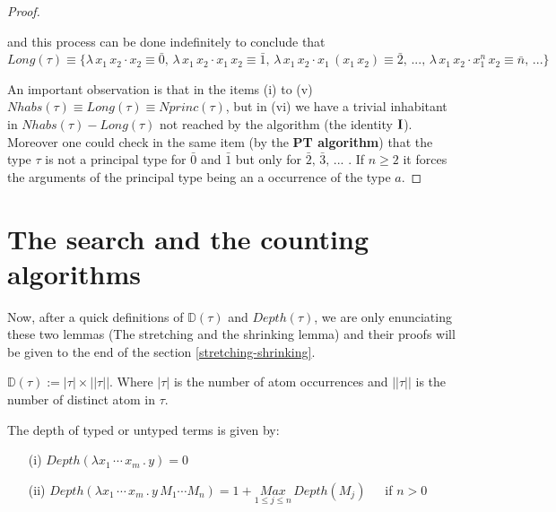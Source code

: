 \documentclass[a4paper,10pt]{article}
\begin{document}
\begin{exa}
\begin{proof}
\begin{itemize}
               and this process can be done indefinitely to conclude that \\
               $Long(\tau) \equiv \{\lambda\,x_1\,x_2\cdot x_2\equiv \bar{0},\, \lambda\,x_1\,x_2\cdot x_1\,x_2\equiv \bar{1},\,\lambda\,x_1\,x_2\cdot x_1\,(x_1\,x_2) \equiv \bar{2},\, ...,\, \lambda\,x_1\,x_2\cdot x_1^n\,x_2\equiv \bar{n},\, ...\}$
 \end{itemize}
 An important observation is that in the items (i) to (v) $Nhabs(\tau) \equiv Long(\tau) \equiv Nprinc(\tau)$, but in (vi) we have a trivial inhabitant in $Nhabs(\tau) - Long(\tau)$
 not reached by the algorithm (the identity $\mbox{\textbf{I}}$). Moreover one could check in the same item (by the \textbf{PT algorithm}) that the type $\tau$ is not
 a principal type for $\bar{0}$ and $\bar{1}$ but only for $\bar{2},\,\bar{3},\,...$ . If $n \geq 2$ it forces the arguments of the principal type being an a occurrence of the type $a$. 
\end{proof}
\end{exa}


\section{The search and the counting algorithms}

Now, after a quick definitions of $\mathbb{D}(\tau)$ and $Depth(\tau)$, we are only enunciating these two lemmas (The stretching and the shrinking lemma) 
and their proofs will be given to the end of the section \ref{stretching-shrinking}.


  \begin{mydef}
        $\mathbb{D}(\tau) := |\tau| \times ||\tau||$. Where $|\tau|$ is the number of atom occurrences and $||\tau||$
        is the number of distinct atom in $\tau$.
  \end{mydef}
  
  \begin{mydef}\label{8A6}
 The depth of typed or untyped terms is given by:
 
 \begin{itemize}
     \item[(i)] $Depth(\lambda x_1\, \cdots \, x_m\, . \, y) = 0$
      \item[(ii)] $Depth(\lambda x_1\, \cdots \, x_m\, . \, y \,M_1 \cdots M_n) = 1+ \underset{1 \leq j \leq n}{Max}\,Depth(M_j)\,\,\,\,\,\,\,$ if $n > 0$
  \end{itemize}
\end{mydef}
\end{document}
